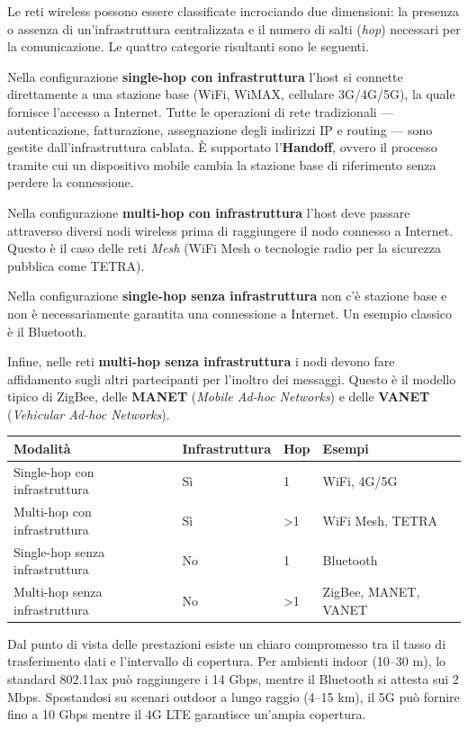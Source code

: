 \documentclass[
  italian,
  openany]{book}
\newcounter{none} %
\begin{document}
Le reti wireless possono essere classificate incrociando due dimensioni:
la presenza o assenza di un'infrastruttura centralizzata e il numero di
salti (\emph{hop}) necessari per la comunicazione. Le quattro categorie
risultanti sono le seguenti.

Nella configurazione \textbf{single-hop con infrastruttura} l'host si
connette direttamente a una stazione base (WiFi, WiMAX, cellulare
3G/4G/5G), la quale fornisce l'accesso a Internet. Tutte le operazioni
di rete tradizionali --- autenticazione, fatturazione, assegnazione
degli indirizzi IP e routing --- sono gestite dall'infrastruttura
cablata. È supportato l'\textbf{Handoff}, ovvero il processo tramite cui
un dispositivo mobile cambia la stazione base di riferimento senza
perdere la connessione.

Nella configurazione \textbf{multi-hop con infrastruttura} l'host deve
passare attraverso diversi nodi wireless prima di raggiungere il nodo
connesso a Internet. Questo è il caso delle reti \emph{Mesh} (WiFi Mesh
o tecnologie radio per la sicurezza pubblica come TETRA).

Nella configurazione \textbf{single-hop senza infrastruttura} non c'è
stazione base e non è necessariamente garantita una connessione a
Internet. Un esempio classico è il Bluetooth.

Infine, nelle reti \textbf{multi-hop senza infrastruttura} i nodi devono
fare affidamento sugli altri partecipanti per l'inoltro dei messaggi.
Questo è il modello tipico di ZigBee, delle \textbf{MANET} (\emph{Mobile
Ad-hoc Networks}) e delle \textbf{VANET} (\emph{Vehicular Ad-hoc
Networks}).

{\def\LTcaptype{none} %
\begin{longtable}[]{@{}llll@{}}
\toprule\noalign{}
Modalità & Infrastruttura & Hop & Esempi \\
\midrule\noalign{}
\endhead
\bottomrule\noalign{}
\endlastfoot
Single-hop con infrastruttura & Sì & 1 & WiFi, 4G/5G \\
Multi-hop con infrastruttura & Sì & \textgreater1 & WiFi Mesh, TETRA \\
Single-hop senza infrastruttura & No & 1 & Bluetooth \\
Multi-hop senza infrastruttura & No & \textgreater1 & ZigBee, MANET,
VANET \\
\end{longtable}
}

Dal punto di vista delle prestazioni esiste un chiaro compromesso tra il
tasso di trasferimento dati e l'intervallo di copertura. Per ambienti
indoor (10--30 m), lo standard 802.11ax può raggiungere i 14 Gbps,
mentre il Bluetooth si attesta sui 2 Mbps. Spostandosi su scenari
outdoor a lungo raggio (4--15 km), il 5G può fornire fino a 10 Gbps
mentre il 4G LTE garantisce un'ampia copertura.
\end{document}
